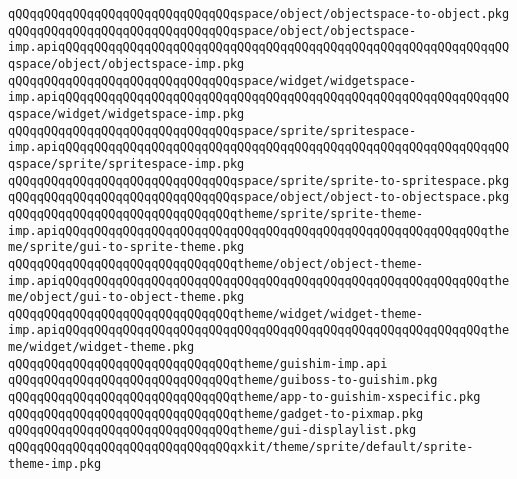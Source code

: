 \verb|qQQqqQQqqQQqqQQqqQQqqQQqqQQqqQQqspace/object/objectspace-to-object.pkg|\newline
\newline
\newline
\verb|qQQqqQQqqQQqqQQqqQQqqQQqqQQqqQQqspace/object/objectspace-imp.apiqQQqqQQqqQQqqQQqqQQqqQQqqQQqqQQqqQQqqQQqqQQqqQQqqQQqqQQqqQQqqQQqspace/object/objectspace-imp.pkg|\newline
\verb|qQQqqQQqqQQqqQQqqQQqqQQqqQQqqQQqspace/widget/widgetspace-imp.apiqQQqqQQqqQQqqQQqqQQqqQQqqQQqqQQqqQQqqQQqqQQqqQQqqQQqqQQqqQQqqQQqspace/widget/widgetspace-imp.pkg|\newline
\verb|qQQqqQQqqQQqqQQqqQQqqQQqqQQqqQQqspace/sprite/spritespace-imp.apiqQQqqQQqqQQqqQQqqQQqqQQqqQQqqQQqqQQqqQQqqQQqqQQqqQQqqQQqqQQqqQQqspace/sprite/spritespace-imp.pkg|\newline
\newline
\verb|qQQqqQQqqQQqqQQqqQQqqQQqqQQqqQQqspace/sprite/sprite-to-spritespace.pkg|\newline
\verb|qQQqqQQqqQQqqQQqqQQqqQQqqQQqqQQqspace/object/object-to-objectspace.pkg|\newline
\newline
\verb|qQQqqQQqqQQqqQQqqQQqqQQqqQQqqQQqtheme/sprite/sprite-theme-imp.apiqQQqqQQqqQQqqQQqqQQqqQQqqQQqqQQqqQQqqQQqqQQqqQQqqQQqqQQqqQQqtheme/sprite/gui-to-sprite-theme.pkg|\newline
\verb|qQQqqQQqqQQqqQQqqQQqqQQqqQQqqQQqtheme/object/object-theme-imp.apiqQQqqQQqqQQqqQQqqQQqqQQqqQQqqQQqqQQqqQQqqQQqqQQqqQQqqQQqqQQqtheme/object/gui-to-object-theme.pkg|\newline
\verb|qQQqqQQqqQQqqQQqqQQqqQQqqQQqqQQqtheme/widget/widget-theme-imp.apiqQQqqQQqqQQqqQQqqQQqqQQqqQQqqQQqqQQqqQQqqQQqqQQqqQQqqQQqqQQqtheme/widget/widget-theme.pkg|\newline
\newline
\newline
\verb|qQQqqQQqqQQqqQQqqQQqqQQqqQQqqQQqtheme/guishim-imp.api|\newline
\verb|qQQqqQQqqQQqqQQqqQQqqQQqqQQqqQQqtheme/guiboss-to-guishim.pkg|\newline
\verb|qQQqqQQqqQQqqQQqqQQqqQQqqQQqqQQqtheme/app-to-guishim-xspecific.pkg|\newline
\verb|qQQqqQQqqQQqqQQqqQQqqQQqqQQqqQQqtheme/gadget-to-pixmap.pkg|\newline
\verb|qQQqqQQqqQQqqQQqqQQqqQQqqQQqqQQqtheme/gui-displaylist.pkg|\newline
\verb|qQQqqQQqqQQqqQQqqQQqqQQqqQQqqQQqxkit/theme/sprite/default/sprite-theme-imp.pkg|\newline
